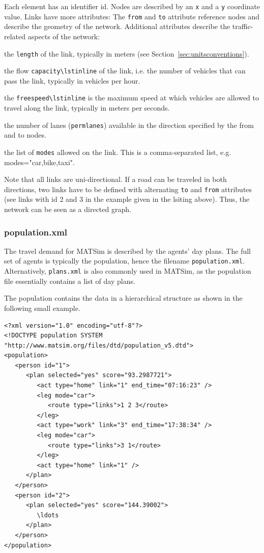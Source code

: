 Each element has an identifier id. Nodes are described by an \lstinline|x| and a \lstinline|y| coordinate value. Links have more attributes: The \lstinline|from| and \lstinline|to| attribute reference nodes and describe the geometry of the network. Additional attributes describe the traffic-related aspects of the network:
\begin{compactitem}
    \item the \lstinline|length| of the link, typically in meters (see Section~\ref{sec:unitsconventions}).
    \item the flow \lstinline|capacity\lstinline| of the link, i.e. the number of vehicles that can pass the link, typically in vehicles per hour.
    \item the \lstinline|freespeed\lstinline| is the maximum speed at which vehicles are allowed to travel along the link, typically in meters per seconds.
    \item the number of lanes (\lstinline|permlanes|) available in the direction specified by the from and to nodes.
    \item the list of \lstinline|modes| allowed on the link. This is a comma-separated list, e.g. modes="car,bike,taxi".
\end{compactitem}
Note that all links are uni-directional. If a road can be traveled in both directions, two links have to be defined with alternating \lstinline|to| and \lstinline|from| attributes (see links with id 2 and 3 in the example given in the lsiting above). Thus, the network can be seen as a directed graph. 

\subsubsection{population.xml}
The travel demand for MATSim is described by the agents' day plans. The full set of agents is typically the population, hence the filename \lstinline|population.xml|. Alternatively, \lstinline|plans.xml| is also commonly used in MATSim, as the population file essentially contains a list of day plans.

The population contains the data in a hierarchical structure as shown in the following small example.

\begin{lstlisting}
<?xml version="1.0" encoding="utf-8"?> 
<!DOCTYPE population SYSTEM "http://www.matsim.org/files/dtd/population_v5.dtd"> 
<population> 
   <person id="1"> 
      <plan selected="yes" score="93.2987721"> 
         <act type="home" link="1" end_time="07:16:23" /> 
         <leg mode="car"> 
            <route type="links">1 2 3</route> 
         </leg> 
         <act type="work" link="3" end_time="17:38:34" /> 
         <leg mode="car"> 
            <route type="links">3 1</route> 
         </leg> 
         <act type="home" link="1" /> 
      </plan> 
   </person> 
   <person id="2"> 
      <plan selected="yes" score="144.39002"> 
         \ldots 
      </plan> 
   </person> 
</population>
\end{lstlisting}


